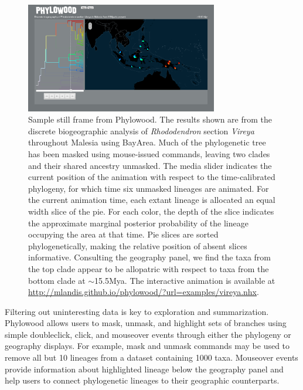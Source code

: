 \documentclass{bioinfo}
\begin{document}

\begin{figure}
\begin{center}
\includegraphics[width=3.3in]{phylowood.png}
\caption{
Sample still frame from Phylowood. The results shown are from the discrete biogeographic analysis of {\it Rhododendron} section {\it Vireya} throughout Malesia using BayArea. Much of the phylogenetic tree has been masked using mouse-issued commands, leaving two clades and their shared ancestry unmasked. The media slider indicates the current position of the animation with respect to the time-calibrated phylogeny, for which time six unmasked lineages are animated.  For the current animation time, each extant lineage is allocated an equal width slice of the pie. For each color, the depth of the slice indicates the approximate marginal posterior probability of the lineage occupying the area at that time. Pie slices are sorted phylogenetically, making the relative position of absent slices informative. Consulting the geography panel, we find the taxa from the top clade appear to be allopatric with respect to taxa from the bottom clade at $\sim$15.5Mya. The interactive animation is available at \href{http://mlandis.github.io/phylowood/?url=examples/vireya.nhx}{http://mlandis.github.io/phylowood/?url=examples/vireya.nhx}.
}
\label{phylowood}
\end{center}
\end{figure}


Filtering out uninteresting data is key to exploration and summarization. Phylowood allows users to mask, unmask, and highlight sets of branches using simple doubleclick, click, and mouseover events through either the phylogeny or geography displays. For example, mask and unmask commands may be used to remove all but 10 lineages from a dataset containing 1000 taxa. Mouseover events provide information about highlighted lineage below the geography panel and help users to connect phylogenetic lineages to their geographic counterparts.
\end{document}
